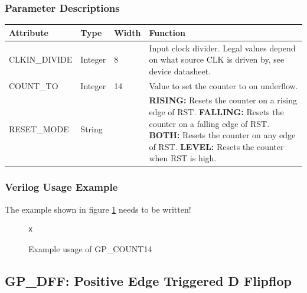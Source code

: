 \documentclass{article}
\begin{document}
\subsubsection{Parameter Descriptions}

\begin{tabularx}{5in}{|l|l|l|X|}
\hline
{\bfseries Attribute} & {\bfseries Type} & {\bfseries Width} & {\bfseries Function} \\
\hline
CLKIN\_DIVIDE & Integer & 8 &
	Input clock divider. Legal values depend on what source CLK is driven by, see device datasheet.\\
\hline
COUNT\_TO & Integer & 14 & Value to set the counter to on underflow. \\
\hline
RESET\_MODE & String &  & 
	{\bfseries RISING: } \newline Resets the counter on a rising edge of RST. \newline
	{\bfseries FALLING: } \newline Resets the counter on a falling edge of RST. \newline
	{\bfseries BOTH: } \newline Resets the counter on any edge of RST. \newline
	{\bfseries LEVEL: } \newline Resets the counter when RST is high. \\
\hline
\end{tabularx}

\subsubsection{Verilog Usage Example}

The example shown in figure \ref{gp-count14-example} needs to be written!

\begin{figure}[h]
\begin{lstlisting}
x
\end{lstlisting}
\caption{Example usage of GP\_COUNT14}
\label{gp-count14-example}
\end{figure}


\pagebreak
\subsection{GP\_DFF: Positive Edge Triggered D Flipflop}
\end{document}
